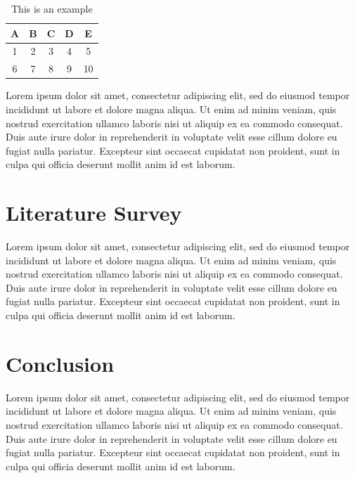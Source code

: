 \documentclass[a4paper,12pt]{report}
\begin{document}
\vspace*{-0.8\baselineskip}
\begin{table}[h]
\centering
\caption{This is an example}
\begin{tabular}{|c|c|c|c|c|}
\hline
A & B & C & D & E  \\
\hline
1 & 2 & 3 & 4 & 5  \\
\hline
6 & 7 & 8 & 9 & 10 \\
\hline
\end{tabular}
\end{table}
\vspace*{-0.5\baselineskip}

Lorem ipsum dolor sit amet, consectetur adipiscing elit, sed do eiusmod tempor incididunt ut labore et dolore magna aliqua. Ut enim ad minim veniam, quis nostrud exercitation ullamco laboris nisi ut aliquip ex ea commodo consequat. Duis aute irure dolor in reprehenderit in voluptate velit esse cillum dolore eu fugiat nulla pariatur. Excepteur sint occaecat cupidatat non proident, sunt in culpa qui officia deserunt mollit anim id est laborum.

\newpage

\section[Literature Survey]{Literature Survey}
Lorem ipsum dolor sit amet, consectetur adipiscing elit, sed do eiusmod tempor incididunt ut labore et dolore magna aliqua. Ut enim ad minim veniam, quis nostrud exercitation ullamco laboris nisi ut aliquip ex ea commodo consequat. Duis aute irure dolor in reprehenderit in voluptate velit esse cillum dolore eu fugiat nulla pariatur. Excepteur sint occaecat cupidatat non proident, sunt in culpa qui officia deserunt mollit anim id est laborum.
\newpage

\section[Conclusion]{Conclusion}
Lorem ipsum dolor sit amet, consectetur adipiscing elit, sed do eiusmod tempor incididunt ut labore et dolore magna aliqua. Ut enim ad minim veniam, quis nostrud exercitation ullamco laboris nisi ut aliquip ex ea commodo consequat. Duis aute irure dolor in reprehenderit in voluptate velit esse cillum dolore eu fugiat nulla pariatur. Excepteur sint occaecat cupidatat non proident, sunt in culpa qui officia deserunt mollit anim id est laborum.
\newpage


\nocite{*}
\printbibliography[title={References}]
\thispagestyle{fancy}
\end{document}
